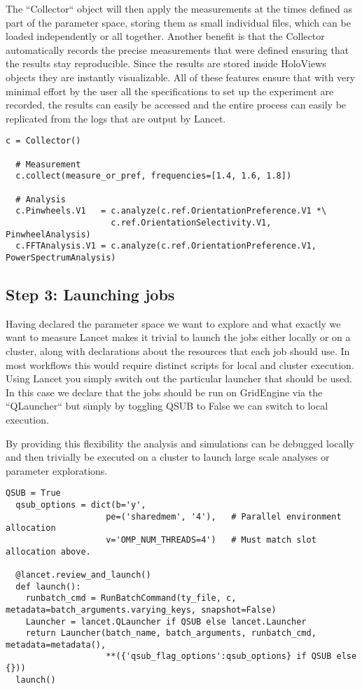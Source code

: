 The ``Collector`` object will then apply the measurements at the times
defined as part of the parameter space, storing them as small
individual files, which can be loaded independently or all
together. Another benefit is that the Collector automatically records
the precise measurements that were defined ensuring that the results
stay reproducible. Since the results are stored inside HoloViews
objects they are instantly visualizable. All of these features ensure
that with very minimal effort by the user all the specifications to
set up the experiment are recorded, the results can easily be accessed
and the entire process can easily be replicated from the logs that are
output by Lancet.

\begin{lstlisting}[frame=single]
  c = Collector()

  # Measurement
  c.collect(measure_or_pref, frequencies=[1.4, 1.6, 1.8])

  # Analysis
  c.Pinwheels.V1   = c.analyze(c.ref.OrientationPreference.V1 *\
                     c.ref.OrientationSelectivity.V1, PinwheelAnalysis)
  c.FFTAnalysis.V1 = c.analyze(c.ref.OrientationPreference.V1, PowerSpectrumAnalysis)
\end{lstlisting}

\subsection{Step 3: Launching jobs}

Having declared the parameter space we want to explore and what
exactly we want to measure Lancet makes it trivial to launch the jobs
either locally or on a cluster, along with declarations about the
resources that each job should use. In most workflows this would
require distinct scripts for local and cluster execution. Using Lancet
you simply switch out the particular launcher that should be used. In
this case we declare that the jobs should be run on GridEngine via the
``QLauncher`` but simply by toggling QSUB to False we can switch to
local execution.

By providing this flexibility the analysis and simulations can be
debugged locally and then trivially be executed on a cluster to launch
large scale analyses or parameter explorations.

\begin{lstlisting}[frame=single]
  QSUB = True
  qsub_options = dict(b='y',
                    pe=('sharedmem', '4'),   # Parallel environment allocation
                    v='OMP_NUM_THREADS=4')   # Must match slot allocation above.

  @lancet.review_and_launch()
  def launch():
    runbatch_cmd = RunBatchCommand(ty_file, c, metadata=batch_arguments.varying_keys, snapshot=False)
    Launcher = lancet.QLauncher if QSUB else lancet.Launcher
    return Launcher(batch_name, batch_arguments, runbatch_cmd,  metadata=metadata(),
                    **({'qsub_flag_options':qsub_options} if QSUB else {}))
  launch()
\end{lstlisting}

